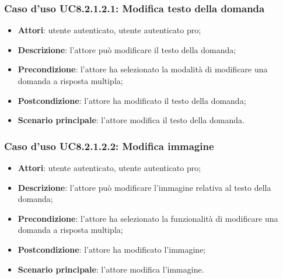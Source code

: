 \subsubsection{Caso d'uso UC8.2.1.2.1: Modifica testo della domanda}
	\begin{itemize}
		\item
			\textbf{Attori}: utente autenticato, utente autenticato pro;
		\item		
			\textbf{Descrizione}: l'attore può modificare il testo della domanda;
		\item
			\textbf{Precondizione}: l'attore ha selezionato la modalità di modificare una domanda a risposta multipla; 
		\item
			\textbf{Postcondizione}: l'attore ha modificato il testo della domanda;
		\item
			\textbf{Scenario principale}: l'attore modifica il testo della domanda. 
	 			
	\end{itemize}
	
\subsubsection{Caso d'uso UC8.2.1.2.2: Modifica immagine}
	\begin{itemize}
		\item
			\textbf{Attori}: utente autenticato, utente autenticato pro;
		\item		
			\textbf{Descrizione}: l'attore può modificare l'immagine relativa al testo della domanda;
		\item
			\textbf{Precondizione}: l'attore ha selezionato la funzionalità di modificare una domanda a risposta multipla; 
		\item
			\textbf{Postcondizione}: l'attore ha modificato l'immagine;
		\item
			\textbf{Scenario principale}: l'attore modifica l'immagine. 	
	\end{itemize}
	
	
